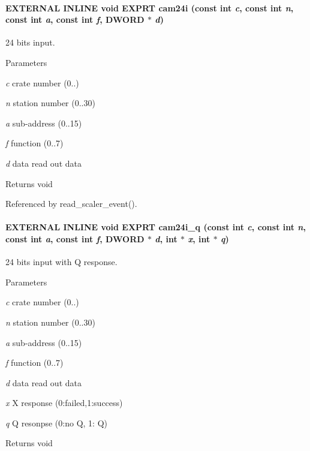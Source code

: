 \paragraph[{cam24i}]{\setlength{\rightskip}{0pt plus 5cm}EXTERNAL INLINE void EXPRT cam24i (const int {\em c}, \/  const int {\em n}, \/  const int {\em a}, \/  const int {\em f}, \/  {\bf DWORD} $\ast$ {\em d})}\hfill\label{group__mcstdfunctionh_ga84d45a99ef748664e1eead0a5da4d862}
24 bits input. 
\begin{DoxyParams}{Parameters}
\item[{\em c}]crate number (0..) \item[{\em n}]station number (0..30) \item[{\em a}]sub-\/address (0..15) \item[{\em f}]function (0..7) \item[{\em d}]data read out data \end{DoxyParams}
\begin{DoxyReturn}{Returns}
void 
\end{DoxyReturn}


Referenced by read\_\-scaler\_\-event().
\paragraph[{cam24i\_\-q}]{\setlength{\rightskip}{0pt plus 5cm}EXTERNAL INLINE void EXPRT cam24i\_\-q (const int {\em c}, \/  const int {\em n}, \/  const int {\em a}, \/  const int {\em f}, \/  {\bf DWORD} $\ast$ {\em d}, \/  int $\ast$ {\em x}, \/  int $\ast$ {\em q})}\hfill\label{group__mcstdfunctionh_ga0f1b4435d6f1fea0e5787a5c2388b41c}
24 bits input with Q response. 
\begin{DoxyParams}{Parameters}
\item[{\em c}]crate number (0..) \item[{\em n}]station number (0..30) \item[{\em a}]sub-\/address (0..15) \item[{\em f}]function (0..7) \item[{\em d}]data read out data \item[{\em x}]X response (0:failed,1:success) \item[{\em q}]Q resonpse (0:no Q, 1: Q) \end{DoxyParams}
\begin{DoxyReturn}{Returns}
void 
\end{DoxyReturn}


